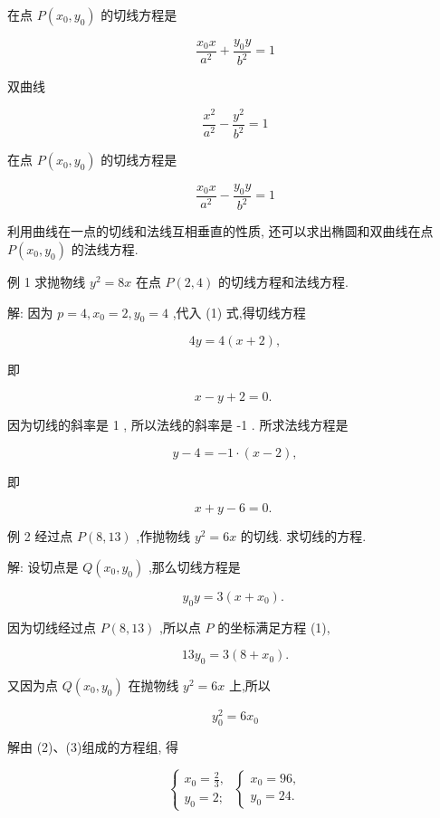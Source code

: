\documentclass[lang=cn,newtx,10pt,scheme=chinese]{elegantbook}
\begin{document}
在点 \(P\left( {{x}_{0},{y}_{0}}\right)\) 的切线方程是

\[
  \frac{{x}_{0}x}{{a}^{2}} + \frac{{y}_{0}y}{{b}^{2}} = 1
\]

双曲线

\[
  \frac{{x}^{2}}{{a}^{2}} - \frac{{y}^{2}}{{b}^{2}} = 1
\]

在点 \(P\left( {{x}_{0},{y}_{0}}\right)\) 的切线方程是

\[
  \frac{{x}_{0}x}{{a}^{2}} - \frac{{y}_{0}y}{{b}^{2}} = 1
\]

利用曲线在一点的切线和法线互相垂直的性质, 还可以求出椭圆和双曲线在点 \(P\left( {{x}_{0},{y}_{0}}\right)\) 的法线方程.

例 1 求抛物线 \({y}^{2} = {8x}\) 在点 \(P\left( {2,4}\right)\) 的切线方程和法线方程.

解: 因为 \(p = 4,{x}_{0} = 2,{y}_{0} = 4\) ,代入 (1) 式,得切线方程

\[
    {4y} = 4\left( {x + 2}\right) ,
\]

即

\[
  x - y + 2 = 0\text{. }
\]

因为切线的斜率是 1 , 所以法线的斜率是 -1 . 所求法线方程是

\[
  y - 4 = - 1 \cdot \left( {x - 2}\right) ,
\]

即

\[
  x + y - 6 = 0\text{. }
\]

例 2 经过点 \(P\left( {8,{13}}\right)\) ,作抛物线 \({y}^{2} = {6x}\) 的切线. 求切线的方程.

解: 设切点是 \(Q\left( {{x}_{0},{y}_{0}}\right)\) ,那么切线方程是

\[
    {y}_{0}y = 3\left( {x + {x}_{0}}\right) \text{. } \tag{1}
\]

因为切线经过点 \(P\left( {8,{13}}\right)\) ,所以点 \(P\) 的坐标满足方程 (1),

\[
    {13}{y}_{0} = 3\left( {8 + {x}_{0}}\right) \text{.} \tag{2}
\]

又因为点 \(Q\left( {{x}_{0},{y}_{0}}\right)\) 在抛物线 \({y}^{2} = {6x}\) 上,所以

\[
    {y}_{0}^{2} = 6{x}_{0} \tag{3}
\]

解由 (2)、(3)组成的方程组, 得

\[
  \left\{ {\begin{array}{l} {x}_{0} = \frac{2}{3}, \\ {y}_{0} = 2; \end{array}\;\left\{ \begin{array}{l} {x}_{0} = {96}, \\ {y}_{0} = {24}. \end{array}\right. }\right.
\]
\end{document}
